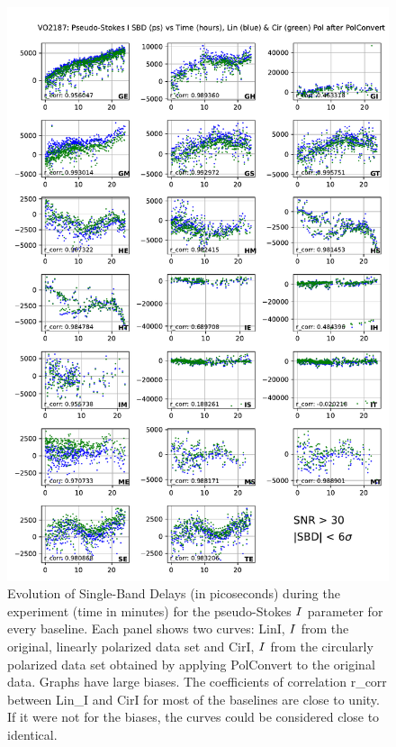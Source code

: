 \documentclass[letterpaper,twoside,12pt]{article}
\begin{document}
\begin{figure}[ht!]
  \begin{center}
  \includegraphics[width=33pc]{VO2187_SBD_Lin_I_and_Cir_I_SNR_floor_30.pdf}
  \caption{\small Evolution of Single-Band Delays (in picoseconds) during the experiment (time in minutes) for the pseudo-Stokes $\protect I$ parameter for every baseline. Each panel shows two curves: LinI, $\protect I$ from the original, linearly polarized data set and CirI, $\protect I$ from the circularly polarized data set obtained by applying PolConvert to the original data. Graphs have large biases. The coefficients of correlation r\_corr between Lin\_I and CirI for most of the baselines are close to unity. If it were not for the biases, the curves could be considered close to identical.}
  \label{sbd_lin_and_cir}
  \end{center}
\end{figure}
\end{document}
